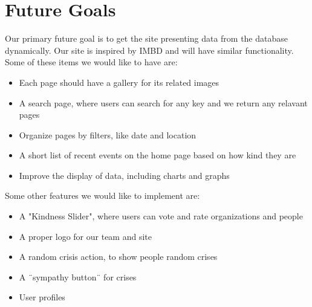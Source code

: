\documentclass[12pt]{report}
\begin{document}
\newpage
\section*{Future Goals}
\hfill


Our primary future goal is to get the site presenting data from the database dynamically.
Our site is inspired by IMBD and will have similar functionality.
Some of these items we would like to have are:
\begin{itemize}
\item Each page should have a gallery for its related images
\item A search page, where users can search for any key and we return any relavant pages
\item Organize pages by filters, like date and location
\item A short list of recent events on the home page based on how kind they are
\item Improve the display of data, including charts and graphs
\end{itemize}

Some other features we would like to implement are:
\begin{itemize}
\item A  "Kindness Slider", where users can vote and rate organizations and people
\item A proper logo for our team and site
\item A random crisis action, to show people random crises
\item A ¨sympathy button¨ for crises
\item User profiles
\end{itemize}
\end{document}
